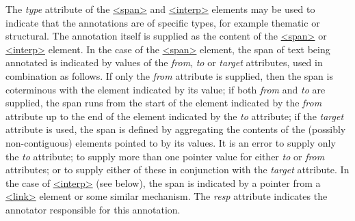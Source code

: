 \par
The {\itshape type} attribute of the \hyperref[TEI.span]{<span>} and \hyperref[TEI.interp]{<interp>} elements may be used to indicate that the annotations are of specific types, for example thematic or structural. The annotation itself is supplied as the content of the \hyperref[TEI.span]{<span>} or \hyperref[TEI.interp]{<interp>} element. In the case of the \hyperref[TEI.span]{<span>} element, the span of text being annotated is indicated by values of the {\itshape from}, {\itshape to} or {\itshape target} attributes, used in combination as follows. If only the {\itshape from} attribute is supplied, then the span is coterminous with the element indicated by its value; if both {\itshape from} and {\itshape to} are supplied, the span runs from the start of the element indicated by the {\itshape from} attribute up to the end of the element indicated by the {\itshape to} attribute; if the {\itshape target} attribute is used, the span is defined by aggregating the contents of the (possibly non-contiguous) elements pointed to by its values. It is an error to supply only the {\itshape to} attribute; to supply more than one pointer value for either {\itshape to} or {\itshape from} attributes; or to supply either of these in conjunction with the {\itshape target} attribute. In the case of \hyperref[TEI.interp]{<interp>} (see below), the span is indicated by a pointer from a \hyperref[TEI.link]{<link>} element or some similar mechanism. The {\itshape resp} attribute indicates the annotator responsible for this annotation.\par
